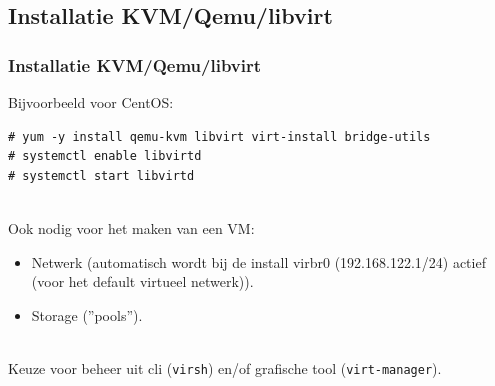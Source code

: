 \subsection {Installatie KVM/Qemu/libvirt}
\begin{styleframefrag}
    \frametitle{Installatie KVM/Qemu/libvirt}
Bijvoorbeeld voor CentOS:
\scriptsize
\begin{verbatim}
# yum -y install qemu-kvm libvirt virt-install bridge-utils
# systemctl enable libvirtd
# systemctl start libvirtd
\end{verbatim}
\pause
~\\
Ook nodig voor het maken van een VM:
\begin{itemize}
	\item Netwerk (automatisch wordt bij de install virbr0 (192.168.122.1/24) actief (voor het default virtueel netwerk)).
	\item Storage (''pools'').
\end{itemize}
\pause
~\\
Keuze voor beheer uit cli ({\tt virsh}) en/of grafische tool ({\tt virt-manager}).
\end{styleframefrag}

